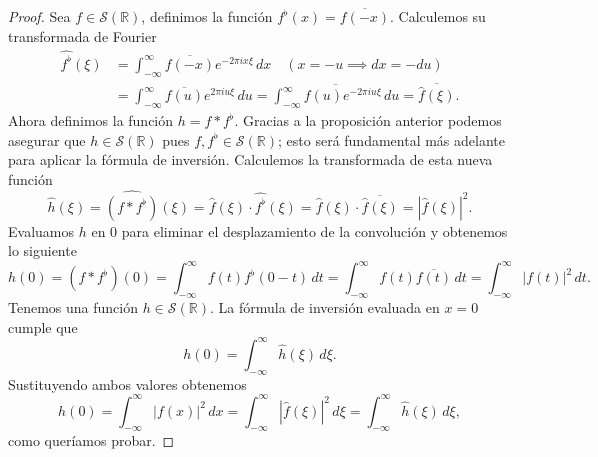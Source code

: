 \documentclass[12pt]{article}
\newcommand{\Sc}{\mathcal{S}(\mathbb{R})}
\theoremstyle{plain}
\theoremstyle{definition}
\numberwithin{equation}{section}
\begin{document}
            \begin{proof}
                Sea \(f \in \Sc\), definimos la función \(f^\flat(x) = \overline{f(-x)}\). Calculemos su transformada de Fourier
                \begin{align*}
                    \widehat{f^\flat}(\xi) &= \int_{-\infty}^{\infty} \overline{f(-x)} e^{-2\pi ix\xi} \,dx \quad \left( x = -u \implies dx = -du \right) \\
                    &= \int_{-\infty}^{\infty} \overline{f(u)} e^{2\pi iu\xi} \,du = \overline{\int_{-\infty}^{\infty} f(u) e^{-2\pi iu\xi} \,du} = \overline{\hat{f}(\xi)}.
                \end{align*}
                Ahora definimos la función \(h = f * f^\flat\). Gracias a la proposición anterior podemos asegurar que \(h \in \Sc\) pues \(f, f^\flat \in \Sc\); esto será fundamental más adelante para aplicar la fórmula de inversión. Calculemos la transformada de esta nueva función
                \begin{equation*}
                    \hat{h}(\xi) = \widehat{(f * f^\flat)}(\xi) = \hat{f}(\xi) \cdot \widehat{f^\flat}(\xi) = \hat{f}(\xi) \cdot \overline{\hat{f}(\xi)} = \left\lvert \hat{f}(\xi) \right\rvert^2.
                \end{equation*}
                Evaluamos \(h\) en \(0\) para eliminar el desplazamiento de la convolución y obtenemos lo siguiente
                \begin{equation*}
                    h(0) = (f * f^\flat)(0) = \int_{-\infty}^{\infty} f(t)f^\flat(0-t) \,dt = \int_{-\infty}^{\infty} f(t)\overline{f(t)} \,dt = \int_{-\infty}^{\infty} \left\lvert f(t) \right\rvert^2 \,dt.
                \end{equation*}
                Tenemos una función \(h \in \Sc\). La fórmula de inversión evaluada en \(x=0\) cumple que
                \begin{equation*}
                    h(0) = \int_{-\infty}^{\infty} \hat{h}(\xi) \,d\xi.
                \end{equation*}
                Sustituyendo ambos valores obtenemos
                \begin{equation*}
                    h(0) = \int_{-\infty}^{\infty} \left\lvert f(x) \right\rvert^2 \,dx = \int_{-\infty}^{\infty} \left\lvert \hat{f}(\xi) \right\rvert^2 \,d\xi = \int_{-\infty}^{\infty} \hat{h}(\xi) \,d\xi,
                \end{equation*}
                como queríamos probar.
            \end{proof}
\end{document}

